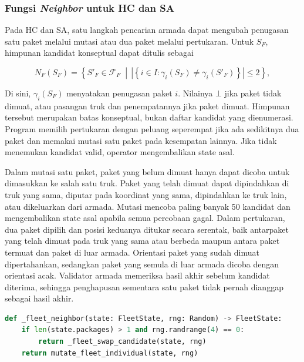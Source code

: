 \subsubsection{Fungsi \textit{Neighbor} untuk HC dan SA}

Pada HC dan SA, satu langkah pencarian armada dapat mengubah penugasan satu paket melalui mutasi atau dua paket melalui pertukaran. Untuk $S_F$, himpunan kandidat konseptual dapat ditulis sebagai

\begin{equation}
    N_F(S_F)=\left\{S'_F\in\mathcal{F}_F\;\middle|\,
    \left|\left\{i\in I:\gamma_i(S_F)\neq\gamma_i(S'_F)\right\}\right|\leq 2
    \right\},
    \label{eq:fleet-neighbor}
\end{equation}

Di sini, $\gamma_i(S_F)$ menyatakan penugasan paket $i$. Nilainya $\bot$ jika paket tidak dimuat, atau pasangan truk dan penempatannya jika paket dimuat. Himpunan tersebut merupakan batas konseptual, bukan daftar kandidat yang dienumerasi. Program memilih pertukaran dengan peluang seperempat jika ada sedikitnya dua paket dan memakai mutasi satu paket pada kesempatan lainnya. Jika tidak menemukan kandidat valid, operator mengembalikan state asal.

Dalam mutasi satu paket, paket yang belum dimuat hanya dapat dicoba untuk dimasukkan ke salah satu truk. Paket yang telah dimuat dapat dipindahkan di truk yang sama, diputar pada koordinat yang sama, dipindahkan ke truk lain, atau dikeluarkan dari armada. Mutasi mencoba paling banyak 50 kandidat dan mengembalikan state asal apabila semua percobaan gagal. Dalam pertukaran, dua paket dipilih dan posisi keduanya ditukar secara serentak, baik antarpaket yang telah dimuat pada truk yang sama atau berbeda maupun antara paket termuat dan paket di luar armada. Orientasi paket yang sudah dimuat dipertahankan, sedangkan paket yang semula di luar armada dicoba dengan orientasi acak. Validator armada memeriksa hasil akhir sebelum kandidat diterima, sehingga penghapusan sementara satu paket tidak pernah dianggap sebagai hasil akhir.

\begin{lstlisting}[language=Python, caption={Pemilihan operasi neighbor armada},label={lst:fleet-neighbor-operator}]
def _fleet_neighbor(state: FleetState, rng: Random) -> FleetState:
    if len(state.packages) > 1 and rng.randrange(4) == 0:
        return _fleet_swap_candidate(state, rng)
    return mutate_fleet_individual(state, rng)
\end{lstlisting}


